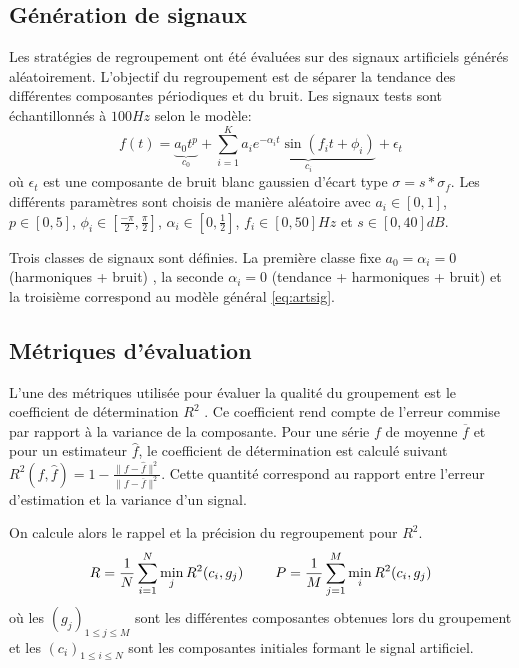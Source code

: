\documentclass{gretsi}
\newcommand{\inter}{\left[0, 1\right]}
\begin{document}
\subsection{Génération de signaux}
\label{sub:artsig}

    Les stratégies de regroupement ont été évaluées sur des signaux artificiels générés aléatoirement.
    L'objectif du regroupement est de séparer la tendance des différentes composantes périodiques et du bruit. Les signaux tests sont échantillonnés à $100Hz$ selon le modèle:
    \begin{equation}\label{eq:artsig}
    f(t) = \underbrace{a_0 t^p}_{c_0} + \sum_{i=1}^K \underbrace{a_i e^{-\alpha_i t} \sin\left(f_i t + \phi_i\right)}_{c_i} + \epsilon_t
    \end{equation}
    où $\epsilon_t$  est une composante de bruit blanc gaussien d'écart type $\sigma = s*\sigma_f$.
    Les différents paramètres sont choisis de manière aléatoire avec $a_i \in \inter$, $p \in \left[0, 5\right]$, $\displaystyle \phi_i \in\left[\frac{-\pi}{2}, \frac{\pi}{2}\right]$, $\alpha_i \in \left[0, \frac{1}{2}\right]$, $f_i \in \left[0, 50\right]Hz$ et $s \in \left[0, 40\right]dB$.
   

    Trois classes de signaux sont définies.
    La première classe fixe $a_0 = \alpha_i = 0$ (harmoniques + bruit) , la seconde $\alpha_i = 0$ (tendance + harmoniques + bruit) et la troisième correspond au modèle général \eqref{eq:artsig}.


\subsection{Métriques d'évaluation}
\label{sub:met}

    L'une des métriques utilisée pour évaluer la qualité du groupement est le coefficient de détermination $R^2$ \cite{abalov_14_auto}.
    Ce coefficient rend compte de l'erreur commise par rapport à la variance de la composante.
    Pour une série $f$ de moyenne $\overline f$ et pour un estimateur $\widehat f$, le coefficient de détermination est calculé suivant $R^2(f, \widehat f) = 1 - \frac{\|f-\widehat f\|^2}{\|f-\overline f\|^2}$.
    Cette quantité correspond au rapport entre l'erreur d'estimation et la variance d'un signal.

    On calcule alors le rappel et la précision du regroupement pour $R^2$.
    \begin{equation}
        R = \frac{1}{N} \sum_{i=1}^N \min_j R^2(c_i, g_j) \hspace{0.8cm} P = \frac{1}{M}\sum_{j=1}^M \min_i R^2(c_i, g_j)
    \end{equation}
    où les $(g_j)_{1\le j \le M}$ sont les différentes composantes obtenues lors du groupement et les $(c_i)_{1\le i\le N}$ sont les composantes initiales formant le signal artificiel.
    
\end{document}

